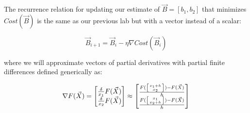 \begin{fullwidth}

The recurrence relation for updating our estimate of $\vec{B}=[b_1, b_2]$ that minimizes $Cost(\vec{B})$ is the same as our previous lab but with a vector instead of a scalar:

\[
\vec{B}_{i+1} = \vec{B}_i - \eta \nabla Cost(\vec{B}_i)
\]

\noindent where we will approximate vectors of partial derivatives with partial finite differences defined generically as:

\[
\nabla F(\vec{X}) =
\begin{bmatrix}
\frac{\delta}{x_1}{F(\vec{X})}\\
\frac{\delta}{x_2}{F(\vec{X})} \\
\end{bmatrix}
\approx
\begin{bmatrix}
\frac{F(\left[ x_1+h \above 0pt{x_2} \right]) - F(\vec{X})}{h} \\
\frac{F(\left[ x_1 \above 0pt{x_2+h} \right]) - F(\vec{X})}{h} \\
\end{bmatrix}
\]


\end{fullwidth}
